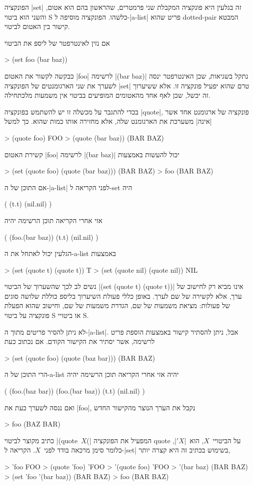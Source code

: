 \documentclass[a4paper,12pt,reqno]{article}
\begin{document}
הפונקציה \T|set| זה בגלעין היא פונקציה המקבלת שני פרמטרים, שהראשון בהם הוא
אטום, והשני הוא ביטוי S כלשהו. הפונקציה מוסיפה ל-\E|a-list| פריט שהוא
dotted-pair המבטא קישור בין האטום לביטוי.

אם נזין לאינטרפטר של ליספ את הביטוי
\begin{LISP}
> (set foo (bar baz))
\end{LISP}
כבקשה לקשור את האטום \T|foo| לרשימה
\T|(bar baz)|
נתקל בשגיאות, שכן האינטרפטר ינסה לשערך את שני הארגומנטים של הפונקציה \E|set|
טרם שהוא יפעיל פונקציה זו. אלא ששיערוך זה יכשל, שכן לאף אחד מהאטומים המופיעים
בביטוי אין משמעות מלכתחילה.

בכדי להתגבר על מכשלה זו יש להשתמש בפונקציה \T|quote|, פונקציה של
ארגומנט אחד אשר \ע|אינה| משערכת את הארגומנט שלה, אלא מחזירה אותו כמות שהוא.
כך למשל
\begin{LISP}
> (quote foo)
FOO
> (quote (bar baz))
(BAR BAZ)
\end{LISP}
קשירת האטום \T|foo| לרשימה \T|(bar baz)| יכול להעשות באמצעות
\begin{LISP}
> (set (quote foo) (quote (bar baz)))
(BAR BAZ)
> foo
(BAR BAZ)
\end{LISP}
אם התוכן של ה-\E|a-list| לפני הקריאה ל-set היה
\begin{LISP}
(
  (t.t)
  (nil.nil)
)
\end{LISP}
אזי אחרי הקריאה תוכן הרשימה יהיה
\begin{LISP}
(
  (foo.(bar baz))
  (t.t)
  (nil.nil)
)
\end{LISP}
הגלעין יכול לאתחל את ה-a-list באמצעות
\begin{LISP}
> (set (quote t) (quote t))
T
> (set (quote nil) (quote nil))
NIL
\end{LISP}
נשים לב לכך שהשערוך של הביטוי \T|(set (quote t) (quote t))| אינו מביא רק לחישוב
של ערך, אלא לקשירה של שם לערך. באופן כללי פעולת השיערוך בליספ כוללת שלושה סוגים
של פעולות: מציאת משמעות של שם, הגדרת משמעות של שם, וחישוב שהוא הפעלת פונקציה על
ביטוי S או ביטויי S.

לא ניתן להסיר פריטים מתוך ה-\E|a-list|. אבל, ניתן להסתיר קישור באמצעות הוספת
פריט לרשימה, אשר יסתיר את הקישור הקודם. אם נכתוב כעת
\begin{LISP}
> (set (quote foo) (quote (baz bar)))
(BAR BAZ)
\end{LISP}
הרי התוכן של ה-a-list יהיה אזי אחרי הקריאה תוכן הרשימה יהיה
\begin{LISP}
(
  (foo.(baz bar))
  (foo.(bar baz))
  (t.t)
  (nil.nil)
)
\end{LISP}
ואם ננסה לשערך כעת את \T|foo|, נקבל את הערך הנוצר מהקישור החדש
\begin{LISP}
> foo
(BAZ BAR)
\end{LISP}
כתיב מקוצר לביטוי \E|(quote~$X$(| המפעיל את הפונקציה quote על הביטויי~$X$,
הוא~\E|$'X$|, כלומר סימן מרכאה בודד לפני~$X$. הקריאה ל-\E|set| בשימוש בכתיב זה
היא קצרה יותר,
\begin{LISP}
> 'foo
FOO
> (quote 'foo)
'FOO
> '(quote foo)
'FOO
> '(bar baz)
(BAR BAZ)
> (set 'foo '(bar baz))
(BAR BAZ)
> foo
(BAR BAZ)
\end{LISP}
\end{document}
